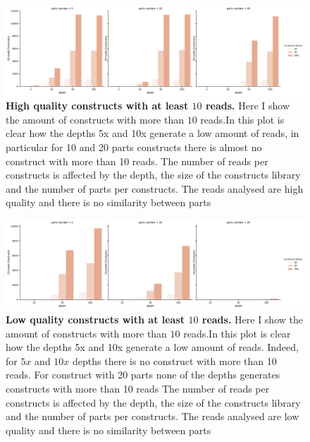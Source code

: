 \documentclass[11pt, a4paper]{article}
\begin{document}
 \begin{figure}[ht]
    \begin{center}
    \includegraphics[width=1.35\textwidth]{../results/images_notebook/v_500/hq_sim_00_10_reads_constructs.pdf}
    \end{center}
    \caption{{\bf High quality constructs with at least $10$ reads.} Here I show the amount of constructs with more than $10$
reads.In this plot is clear how the depths 5x and 10x generate a low amount of reads, in particular for 10 and 20 parts constructs there is almost no construct with more than 10 reads. The number of reads per constructs is affected by the depth, the size of the constructs library and the number of parts per constructs.     
The reads analysed are high quality and there is no similarity between parts}
   \label{fig:v_500_hq_sim_00_10_reads_construct}
\end{figure}


\begin{figure}[ht]
    \begin{center}
    \includegraphics[width=1.35\textwidth]{../results/images_notebook/v_500/lq_sim_00_10_reads_constructs.pdf}
    \end{center}
    \caption{{\bf Low quality constructs with at least $10$ reads.} Here I show the amount of constructs with more than $10$
reads.In this plot is clear how the depths 5x and 10x generate a low amount of reads. Indeed, for $5x$ and $10x$ depths there is no construct with more than 10 reads. For construct with 20 parts none of the depths generates constructs with more than 10 reads 
The number of reads per constructs is affected by the depth, the size of the constructs library and the number of parts per constructs.     
The reads analysed are low quality and there is no similarity between parts}
   \label{fig:v_500_lq_sim_00_10_reads_construct}
\end{figure}
\end{document}
